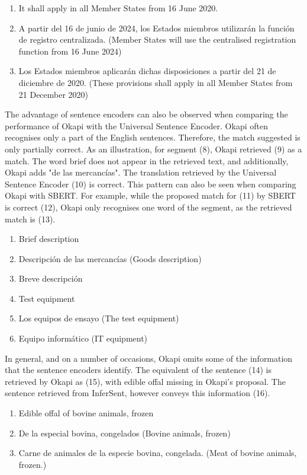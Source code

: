 \begin{enumerate}[resume,label={(\arabic*)}]
	\item It shall apply in all Member States from 16 June 2020.
	\item A partir del 16 de junio de 2024, los Estados miembros utilizarán la función de registro centralizada. (Member States will use the centralised registration function from 16 June 2024)
	\item Los Estados miembros aplicarán dichas disposiciones a partir del 21 de diciembre de 2020. (These provisions shall apply in all Member States from 21 December 2020)
	
\end{enumerate}

The advantage of sentence encoders can also be observed when comparing the performance of Okapi with the Universal Sentence Encoder. Okapi often recognises only a part of the English sentences. Therefore, the match suggested is only partially correct. As an illustration, for segment (8), Okapi retrieved (9) as a match. The word brief does not appear in the retrieved text, and additionally, Okapi adds "de las mercancías". The translation retrieved by the Universal Sentence Encoder (10) is correct. This pattern can also be seen when comparing Okapi with SBERT. For example, while the proposed match for (11) by SBERT is correct (12), Okapi only recognises one word of the segment, as the retrieved match is (13). 

\begin{enumerate}[resume,label={(\arabic*)}]
	\item	Brief description
	\item	Descripción de las mercancías (Goods description)
	\item	Breve descripción
	\item	Test equipment
	\item	Los equipos de ensayo (The test equipment)
	\item	Equipo informático (IT equipment)
\end{enumerate}


In general, and on a number of occasions, Okapi omits some of the information that the sentence encoders identify. The equivalent of the sentence (14) is retrieved by Okapi as (15), with edible offal missing in Okapi’s proposal. The sentence retrieved from InferSent, however conveys this information (16).

\begin{enumerate}[resume,label={(\arabic*)}]
	\item	Edible offal of bovine animals, frozen
	\item	De la especial bovina, congelados (Bovine animals, frozen)
	\item	Carne de animales de la especie bovina, congelada. (Meat of bovine animals, frozen.)
\end{enumerate}

